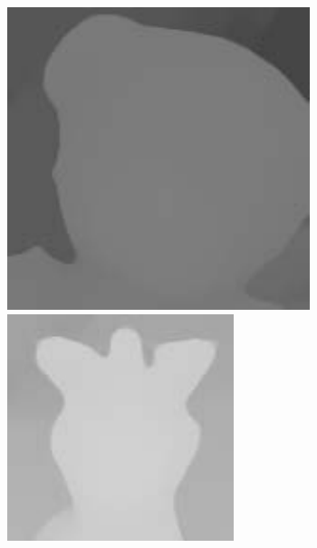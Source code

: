 \documentclass{bjtu-bachelor-thesis}
\begin{document}
\begin{figure}[!htbp]
\begin{minipage}[b]{\linewidth}
{\begin{minipage}[b]{0.085\linewidth}
      \includegraphics[width=\linewidth]{figures/doll/cvpr_0.pdf}\vspace{2pt}
      \includegraphics[width=\linewidth]{figures/doll/cvpr_1.pdf}

\end{minipage}}
\end{minipage}
\end{figure}
\end{document}
